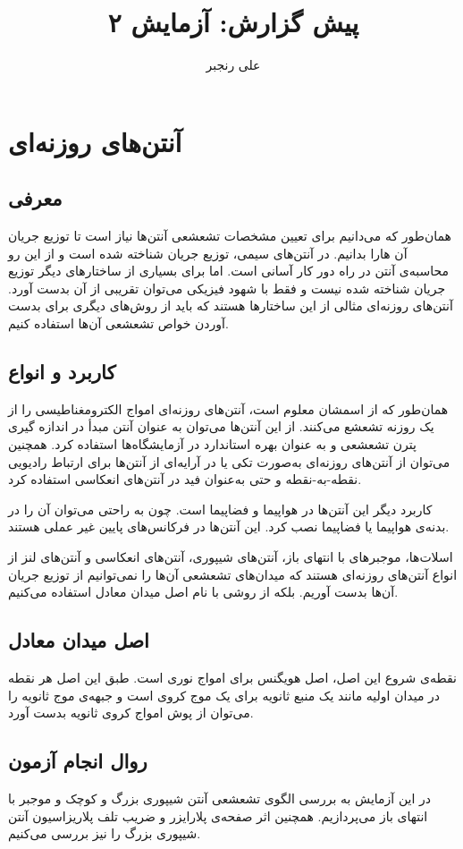 \documentclass[logo=images/logo.png]{tehranReport}
\title{پیش گزارش: آزمایش ۲}
\author{علی رنجبر}
\begin{document}
    \maketitlepage

    \section*{آنتن‌های روزنه‌ای}
    

    \subsection{معرفی}
	همان‌طور که می‌دانیم برای تعیین مشخصات تشعشعی آنتن‌ها نیاز است تا توزیع جریان آن ‌هارا بدانیم. در آنتن‌های سیمی، توزیع جریان شناخته شده است و از این رو محاسبه‌ی آنتن در راه دور کار آسانی است. اما برای بسیاری از ساختارهای دیگر توزیع جریان شناخته شده نیست و فقط با شهود فیزیکی می‌توان تقریبی از آن بدست آورد. آنتن‌های روزنه‌ای مثالی از این ساختار‌ها هستند که باید از روش‌های دیگری برای بدست آوردن خواص تشعشعی آن‌‌ها استفاده کنیم.
	\subsection{کاربرد و انواع}
	همان‌طور که از اسمشان معلوم است، آنتن‌‌های روزنه‌ای امواج الکترومغناطیسی را از یک روزنه تشعشع می‌کنند. از این آنتن‌ها می‌توان به عنوان آنتن مبدأ در اندازه گیری پترن تشعشعی و به عنوان بهره‌ استاندارد در آزمایشگاه‌ها استفاده کرد. همچنین می‌توان از آنتن‌های روزنه‌ای به‌صورت تکی یا در آرایه‌ای از آنتن‌ها برای ارتباط رادیویی نقطه-به-نقطه و حتی به‌عنوان فید در آنتن‌های انعکاسی استفاده کرد.
	
	کاربرد دیگر این آنتن‌ها در هواپیما و فضاپیما است. چون به راحتی می‌توان آن را در بدنه‌ی هواپیما یا فضاپیما نصب کرد. این آنتن‌ها در فرکانس‌های پایین غیر عملی هستند.
	
	اسلات‌ها، موجبرهای با انتهای باز، آنتن‌های شیپوری، آنتن‌های انعکاسی و آنتن‌های لنز از انواع آنتن‌های روزنه‌ای هستند که میدان‌های تشعشعی آن‌ها را نمی‌توانیم از توزیع جریان آن‌ها بدست آوریم. بلکه از روشی با نام اصل میدان معادل استفاده می‌کنیم.
	
	\subsection{اصل میدان معادل}
	نقطه‌ی شروع این اصل، اصل هویگنس برای امواج نوری است. طبق این اصل هر نقطه در میدان اولیه مانند یک منبع ثانویه برای یک موج کروی است و جبهه‌ی موج ثانویه را می‌توان از پوش امواج کروی ثانویه بدست آورد.
	\subsection{روال انجام آزمون}
	در این آزمایش به بررسی الگوی تشعشعی آنتن شیپوری بزرگ و کوچک و موجبر با انتهای باز می‌پردازیم. همچنین اثر صفحه‌ی پلارایزر و ضریب تلف پلاریزاسیون آنتن شیپوری بزرگ را نیز بررسی می‌کنیم.
	
\end{document}
